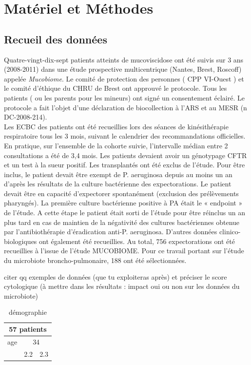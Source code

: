 \documentclass[12pt,a4paper]{article}
\begin{document}
\section{Matériel et Méthodes}
\subsection{Recueil des données}

Quatre-vingt-dix-sept patients atteints de mucoviscidose ont été suivis sur 3 ans (2008-2011) dans une étude prospective multicentrique (Nantes, Brest, Roscoff) appelée \textit{Mucobiome}.
Le comité de protection des personnes ( CPP VI-Ouest ) et le comité d’éthique du CHRU de Brest ont approuvé le protocole. Tous les patients ( ou les parents pour les mineurs) ont signé un consentement éclairé. Le protocole a fait l’objet d’une déclaration de biocollection à l’ARS et au MESR (n DC-2008-214).\\
Les ECBC des patients ont été recueillies lors des séances de kinésithérapie respiratoire tous les 3 mois, suivant le calendrier des recommandations officielles. En pratique, sur l’ensemble de la cohorte suivie, l’intervalle médian entre 2 consultations a été de 3,4 mois.
Les patients devaient avoir un génotypage CFTR et un test à la sueur positif. Les transplantés ont été exclus de l’étude.
Pour être inclus, le patient devait être exempt de P. aeruginosa depuis au moins un an d’après les résultats de la culture bactérienne des expectorations. Le patient devait être en capacité d’expectorer spontanément (exclusion des prélèvements pharyngés).
La première culture bactérienne positive à PA était le « endpoint » de l’étude. A cette étape le patient était sorti de l’étude pour être réinclus un an plus tard en cas de maintien de la négativité des cultures bactériennes obtenue par l’antibiothérapie d’éradication anti-P. aeruginosa. D’autres données clinico-biologiques ont également été recueillies. Au total, 756 expectorations ont été recueillies à l’issue de l’étude MUCOBIOME. Pour ce travail portant sur l’étude du microbiote broncho-pulmonaire, 188 ont été sélectionnées.

citer qq exemples de données (que tu exploiteras après) et préciser le score
cytologique (à mettre dans les résultats : impact oui ou non sur les données du microbiote)

\begin{table}[h]
\centering
   \caption{démographie}
   \begin{tabular}{|l|c|c}
        \hline
   \multicolumn{3}{|c|}{     57 patients     } \\
    \hline
    age & \multicolumn{2}{|c|}{34}  \\
    \hline

        & 2.2 & 2.3 \\
    \hline
   \end{tabular}
\end{table}
\end{document}
